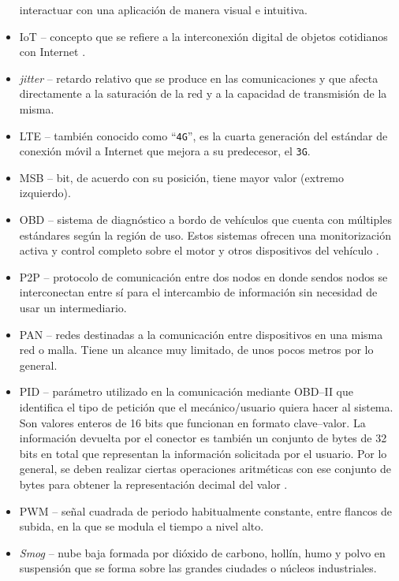 \begin{itemize}
        interactuar con una aplicación de manera visual e intuitiva.
  \item \ac{IoT} -- concepto que se refiere a la interconexión digital de objetos 
        cotidianos con Internet \cite{InternetCosas2021}.
  \item \textit{jitter} -- retardo relativo que se produce en las comunicaciones
        y que afecta directamente a la saturación de la red y a la capacidad de
        transmisión de la misma.
  \item \ac{LTE} -- también conocido como ``\texttt{4G}'', es la cuarta generación
        del estándar de conexión móvil a Internet que mejora a su predecesor, el \texttt{3G}.
  \item \ac{MSB} -- bit, de acuerdo con su posición, tiene mayor valor (extremo izquierdo).
  \item \ac{OBD} -- sistema de diagnóstico a bordo de vehículos que cuenta con múltiples estándares según la región de uso. Estos
        sistemas ofrecen una monitorización activa y control completo
        sobre el motor y otros dispositivos del vehículo \cite{OBD2021}.
  \item \ac{P2P} -- protocolo de comunicación entre dos nodos en donde sendos nodos se
        interconectan entre sí para el intercambio de información sin necesidad de usar
        un intermediario.
  \item \ac{PAN} -- redes destinadas a la comunicación entre dispositivos en una
        misma red o malla. Tiene un alcance muy limitado, de unos pocos metros por
        lo general.
  \item \ac{PID} -- parámetro utilizado en la comunicación mediante \ac{OBD}--II que
        identifica el tipo de petición que el mecánico/usuario quiera hacer al sistema.
        Son valores enteros de 16 bits que funcionan en formato clave--valor. La información
        devuelta por el conector es también un conjunto de bytes de 32 bits en total que
        representan la información solicitada por el usuario. Por lo general, se deben
        realizar ciertas operaciones aritméticas con ese conjunto de bytes para obtener
        la representación decimal del valor \cite{OBDIIPIDs2021}.
  \item \ac{PWM} -- señal cuadrada de periodo habitualmente constante, entre flancos de
        subida, en la que se modula el tiempo a nivel alto.
  \item \textit{Smog} -- nube baja formada por dióxido de carbono, hollín, humo y polvo
        en suspensión que se forma sobre las grandes ciudades o núcleos industriales.

\end{itemize}
